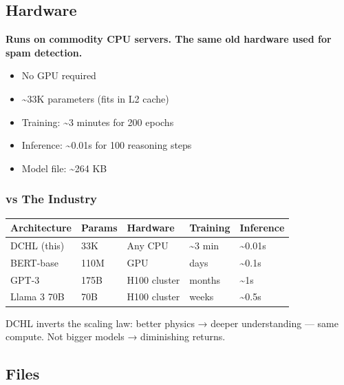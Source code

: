 \documentclass[
  11pt,
  a4paper,
]{article}
\providecommand{\tightlist}{%
  \setlength{\itemsep}{0pt}\setlength{\parskip}{0pt}}
\begin{document}
\subsection{Hardware}\label{hardware}

\textbf{Runs on commodity CPU servers. The same old hardware used for
spam detection.}

\begin{itemize}
\tightlist
\item
  No GPU required
\item
  \textasciitilde33K parameters (fits in L2 cache)
\item
  Training: \textasciitilde3 minutes for 200 epochs
\item
  Inference: \textasciitilde0.01s for 100 reasoning steps
\item
  Model file: \textasciitilde264 KB
\end{itemize}

\subsubsection{vs The Industry}\label{vs-the-industry}

\begin{longtable}[]{@{}lllll@{}}
\toprule\noalign{}
Architecture & Params & Hardware & Training & Inference \\
\midrule\noalign{}
\endhead
\bottomrule\noalign{}
\endlastfoot
DCHL (this) & 33K & Any CPU & \textasciitilde3 min &
\textasciitilde0.01s \\
BERT-base & 110M & GPU & days & \textasciitilde0.1s \\
GPT-3 & 175B & H100 cluster & months & \textasciitilde1s \\
Llama 3 70B & 70B & H100 cluster & weeks & \textasciitilde0.5s \\
\end{longtable}

DCHL inverts the scaling law: better physics → deeper understanding ---
same compute. Not bigger models → diminishing returns.

\subsection{Files}\label{files}
\end{document}
